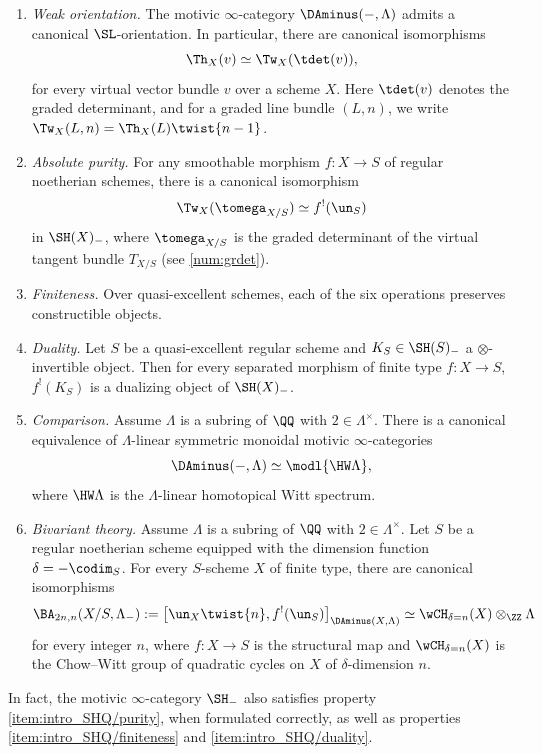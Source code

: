\begin{thmi}
\begin{enumerate}\renewcommand{\theenumi}{\Roman{enumi}}
\item\emph{Weak orientation.}
The motivic $\infty$-category $\DAminus(-, \Lambda)$ admits a canonical $\SL$\nobreakdash-orientation.
In particular, there are canonical isomorphisms\vspace*{-3pt}
\[
\Th_X(v) \simeq \Tw_X(\tdet(v)),
\]
for every virtual vector bundle $v$ over a scheme $X$.
Here $\tdet(v)$ denotes the graded determinant, and for a graded line bundle $(L,n)$, we write \hbox{$\Tw_X(L,n) = \Th_X(L)\twist{n-1}$}.
\item\emph{Absolute purity.}
For any smoothable morphism $f : X \to S$ of regular noetherian schemes, there is a canonical isomorphism\vspace*{-3pt}
\[
\Tw_X(\tomega_{X/S})
\simeq f^!(\un_{S})
\]
in $\SH(X)_-$, where $\tomega_{X/S}$ is the graded determinant of the virtual tangent bundle $T_{X/S}$ (see \ref{num:grdet}).
\item\emph{Finiteness.}
Over quasi-excellent schemes, each of the six operations preserves constructible objects.
\item\emph{Duality.}
Let $S$ be a quasi-excellent regular scheme and $K_S \in \SH(S)_-$ a $\otimes$-invertible object.
Then for every separated morphism of finite type $f : X \to S$, $f^!(K_S)$ is a dualizing object of $\SH(X)_-$.
\item\emph{Comparison.}\label{item:intro_SHminus/comparison}
Assume $\Lambda$ is a subring of $\QQ$ with $2 \in \Lambda^\times$.
There is a canonical equivalence of $\Lambda$-linear symmetric monoidal motivic $\infty$-categories
\[
\DAminus(-, \Lambda) \simeq \modl{\HW \Lambda},
\]
where $\HW \Lambda$ is the $\Lambda$-linear homotopical Witt spectrum.
\item\emph{Bivariant theory.}
Assume $\Lambda$ is a subring of $\QQ$ with $2 \in \Lambda^\times$.
Let $S$ be a regular noetherian scheme equipped with the dimension function $\delta=-\codim_S$.
For every $S$-scheme $X$ of finite type, there are canonical isomorphisms
\[
\BA_{2n,n}(X/S, \Lambda_-)
:= \big[ \un_X\twist{n}, f^!(\un_S) \big]_{\DAminus(X, \Lambda)}
\simeq \wCH_{\delta=n}(X) \otimes_\ZZ \Lambda
\]
for every integer $n$, where $f : X \to S$ is the structural map and $\wCH_{\delta=n}(X)$ is the Chow--Witt group of quadratic cycles on $X$ of $\delta$-dimension $n$.
\end{enumerate}
\end{thmi}

In fact, the motivic $\infty$-category $\SH_{-}$ also satisfies property \eqref{item:intro_SHQ/purity}, when formulated correctly, as well as properties \eqref{item:intro_SHQ/finiteness} and \eqref{item:intro_SHQ/duality}.

